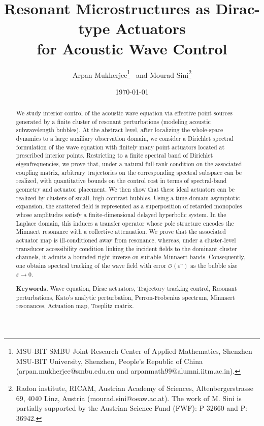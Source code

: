 \documentclass[11pt,a4paper]{article}
\title{%
\textbf{Resonant Microstructures as Dirac-type Actuators\\ for Acoustic Wave Control}
}
\author{Arpan Mukherjee\footnote{MSU-BIT SMBU Joint Research Center of Applied Mathematics, Shenzhen MSU-BIT University, Shenzhen, People's Republic of China (arpan.mukherjee@smbu.edu.cn and arpanmath99@alumni.iitm.ac.in).} \ and
Mourad Sini\thanks{Radon institute, RICAM, Austrian Academy of Sciences, Altenbergerstrasse 69, 4040 Linz, Austria (mourad.sini@oeaw.ac.at). The work of M. Sini is partially supported by the Austrian Science Fund (FWF): P 32660 and  P: 36942.}}
\date{\today}
\numberwithin{equation}{section}
\begin{document}
\maketitle

\begin{abstract}




\bigskip

We study interior control of the acoustic wave equation via effective point sources generated by a finite cluster of resonant perturbations (modeling acoustic subwavelength bubbles). At the abstract level, after localizing the whole-space dynamics to a large auxiliary observation domain, we consider a Dirichlet spectral formulation of the wave equation with finitely many point actuators located at prescribed interior points. Restricting to a finite spectral band of Dirichlet eigenfrequencies, we prove that, under a natural full-rank condition on the associated coupling matrix, arbitrary trajectories on the corresponding spectral subspace can be realized, with quantitative bounds on the control cost in terms of spectral-band geometry and actuator placement.
\newline
We then show that these ideal actuators can be realized by clusters of small, high-contrast bubbles. Using a time-domain asymptotic expansion, the scattered field is represented as a superposition of retarded monopoles whose amplitudes satisfy a finite-dimensional delayed hyperbolic system. In the Laplace domain, this induces a transfer operator whose pole structure encodes the Minnaert resonance with a collective attenuation.
\newline
We prove that the associated actuator map is ill-conditioned away from resonance, whereas, under a cluster-level transducer accessibility condition linking the incident fields to the dominant cluster channels, it admits a bounded right inverse on suitable Minnaert bands. Consequently, one obtains spectral tracking of the wave field with error $\mathcal{O}(\varepsilon^\gamma)$ as the bubble size $\varepsilon \to 0$.


\medskip
\noindent
\textbf{Keywords.} Wave equation, Dirac actuators, Trajectory tracking control, Resonant perturbations, Kato's analytic perturbation, Perron-Frobenius spectrum, Minnaert resonances, Actuation map, Toeplitz matrix.

\end{abstract}

\tableofcontents

\end{document}
